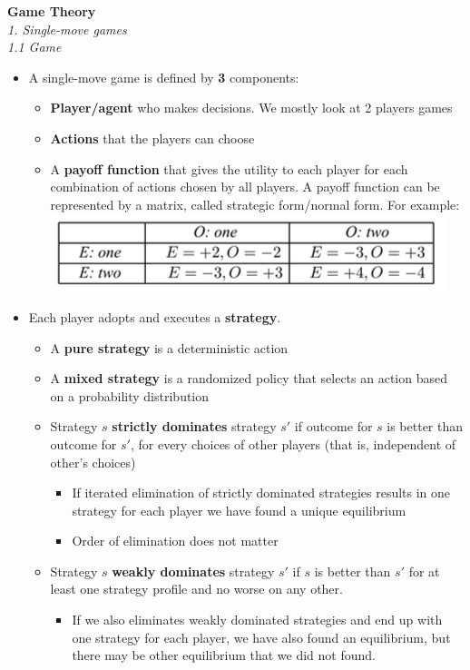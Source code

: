 \documentclass[12pt]{article}
\begin{document}
\noindent
{\large{ \textbf{Game Theory} }}\\

\noindent
\textsl{1. Single-move games }\\

\noindent
\textsl{1.1 Game}
\begin{itemize}
\item A single-move game is defined by \textbf{3} components:

\begin{itemize}
\item \textbf{Player/agent} who makes decisions. We mostly look at 2 players games
\item \textbf{Actions} that the players can choose
\item A \textbf{payoff function} that gives the utility to each player for each combination of actions chosen by all players. A payoff function can be represented by a matrix, called strategic form/normal form. For example: \\
\includegraphics[scale=0.5]{p1}
\end{itemize}

\item Each player adopts and executes a \textbf{strategy}.
 \begin{itemize}
 \item A \textbf{pure strategy} is a deterministic action
 \item A \textbf{mixed strategy} is a randomized policy that selects an action based on a probability distribution 
 \item Strategy $s$ \textbf{strictly dominates} strategy $s'$ if outcome for $s$ is better than outcome for $s'$, for every choices of other players (that is, independent of other's choices)
  \begin{itemize}
  \item If iterated elimination of strictly dominated strategies results in one strategy for each player we have found a unique equilibrium
  \item Order of elimination does not matter 
  \end{itemize}
 \item Strategy $s$ \textbf{weakly dominates} strategy $s'$ if $s$ is better than $s'$ for at least one strategy profile and no worse on any other.
   \begin{itemize}
  \item  If we also eliminates weakly dominated strategies and end up with one strategy for each player, we have also found an equilibrium, but there may be other equilibrium that we did not found.
  \end{itemize}
  

\end{itemize}
\end{itemize}
\end{document}
